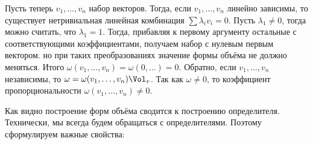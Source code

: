 \begin{thm}
Пусть теперь $v_1,\dots,v_n$ набор векторов. Тогда, если $v_1,\dots,v_n$ линейно зависимы, то существует нетривиальная линейная комбинация $\sum \lambda_i v_i=0$. Пусть $\lambda_1\neq 0$, тогда можно считать, что $\lambda_1=1$. Тогда, прибавляя к первому аргументу остальные с соответствующими коэффициентами, получаем набор с нулевым первым вектором. но при таких преобразованиях значение формы объёма не должно меняться. Итого $\omega(v_1,\dots,v_n)=\omega(0,\dots)=0$.
Обратно, если $v_1,\dots,v_n$ независимы, то $\omega=\omega(v_1,\dots,v_n)\Vol_v$. Так как $\omega \neq 0$, то коэффициент пропорциональности $\omega(v_1,\dots,v_n)\neq 0$.
\endproof
\end{thm}


Как видно построение форм объёма сводится к построению определителя. Технически, мы всегда будем обращаться с определителями. Поэтому сформулируем важные свойства: 


